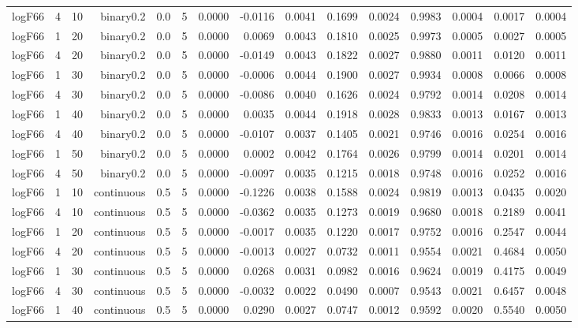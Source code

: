 \begin{longtable}{rrrrrrrrrrrrrrr}
  logF66 & 4 & 10 & binary0.2 & 0.0 & 5 & 0.0000 & -0.0116 & 0.0041 & 0.1699 & 0.0024 & 0.9983 & 0.0004 & 0.0017 & 0.0004 \\ 
  logF66 & 1 & 20 & binary0.2 & 0.0 & 5 & 0.0000 & 0.0069 & 0.0043 & 0.1810 & 0.0025 & 0.9973 & 0.0005 & 0.0027 & 0.0005 \\ 
  logF66 & 4 & 20 & binary0.2 & 0.0 & 5 & 0.0000 & -0.0149 & 0.0043 & 0.1822 & 0.0027 & 0.9880 & 0.0011 & 0.0120 & 0.0011 \\ 
  logF66 & 1 & 30 & binary0.2 & 0.0 & 5 & 0.0000 & -0.0006 & 0.0044 & 0.1900 & 0.0027 & 0.9934 & 0.0008 & 0.0066 & 0.0008 \\ 
  logF66 & 4 & 30 & binary0.2 & 0.0 & 5 & 0.0000 & -0.0086 & 0.0040 & 0.1626 & 0.0024 & 0.9792 & 0.0014 & 0.0208 & 0.0014 \\ 
  logF66 & 1 & 40 & binary0.2 & 0.0 & 5 & 0.0000 & 0.0035 & 0.0044 & 0.1918 & 0.0028 & 0.9833 & 0.0013 & 0.0167 & 0.0013 \\ 
  logF66 & 4 & 40 & binary0.2 & 0.0 & 5 & 0.0000 & -0.0107 & 0.0037 & 0.1405 & 0.0021 & 0.9746 & 0.0016 & 0.0254 & 0.0016 \\ 
  logF66 & 1 & 50 & binary0.2 & 0.0 & 5 & 0.0000 & 0.0002 & 0.0042 & 0.1764 & 0.0026 & 0.9799 & 0.0014 & 0.0201 & 0.0014 \\ 
  logF66 & 4 & 50 & binary0.2 & 0.0 & 5 & 0.0000 & -0.0097 & 0.0035 & 0.1215 & 0.0018 & 0.9748 & 0.0016 & 0.0252 & 0.0016 \\ 
  logF66 & 1 & 10 & continuous & 0.5 & 5 & 0.0000 & -0.1226 & 0.0038 & 0.1588 & 0.0024 & 0.9819 & 0.0013 & 0.0435 & 0.0020 \\ 
  logF66 & 4 & 10 & continuous & 0.5 & 5 & 0.0000 & -0.0362 & 0.0035 & 0.1273 & 0.0019 & 0.9680 & 0.0018 & 0.2189 & 0.0041 \\ 
  logF66 & 1 & 20 & continuous & 0.5 & 5 & 0.0000 & -0.0017 & 0.0035 & 0.1220 & 0.0017 & 0.9752 & 0.0016 & 0.2547 & 0.0044 \\ 
  logF66 & 4 & 20 & continuous & 0.5 & 5 & 0.0000 & -0.0013 & 0.0027 & 0.0732 & 0.0011 & 0.9554 & 0.0021 & 0.4684 & 0.0050 \\ 
  logF66 & 1 & 30 & continuous & 0.5 & 5 & 0.0000 & 0.0268 & 0.0031 & 0.0982 & 0.0016 & 0.9624 & 0.0019 & 0.4175 & 0.0049 \\ 
  logF66 & 4 & 30 & continuous & 0.5 & 5 & 0.0000 & -0.0032 & 0.0022 & 0.0490 & 0.0007 & 0.9543 & 0.0021 & 0.6457 & 0.0048 \\ 
  logF66 & 1 & 40 & continuous & 0.5 & 5 & 0.0000 & 0.0290 & 0.0027 & 0.0747 & 0.0012 & 0.9592 & 0.0020 & 0.5540 & 0.0050 \\ 

\end{longtable}
